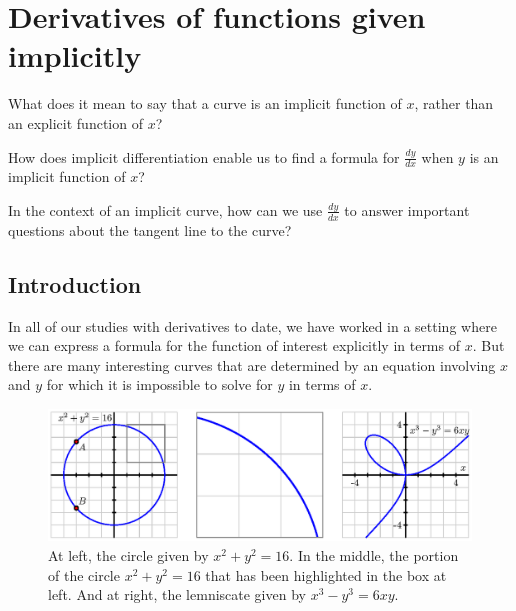 \section{Derivatives of functions given implicitly} \label{S:2.7.Implicit}

\begin{goals}
\item What does it mean to say that a curve is an implicit function of $x$, rather than an explicit function of $x$?
\item How does implicit differentiation enable us to find a formula for $\frac{dy}{dx}$ when $y$ is an implicit function of $x$?
\item In the context of an implicit curve, how can we use $\frac{dy}{dx}$ to answer important questions about the tangent line to the curve?
\end{goals}

\subsection*{Introduction}

In all of our studies with derivatives to date, we have worked in a setting where we can express a formula for the function of interest explicitly in terms of $x$.  But there are many interesting curves that are determined by an equation involving $x$ and $y$ for which it is impossible to solve for $y$ in terms of $x$.

\begin{figure}[h]
\includegraphics{figures/2_7_Intro.eps}
\caption{At left, the circle given by $x^2 + y^2 = 16$.  In the middle, the portion of the circle $x^2 + y^2 = 16$ that has been highlighted in the box at left.  And at right, the lemniscate given by $x^3 - y^3 = 6xy$.} \label{fig:2.7.Intro}
\end{figure}

